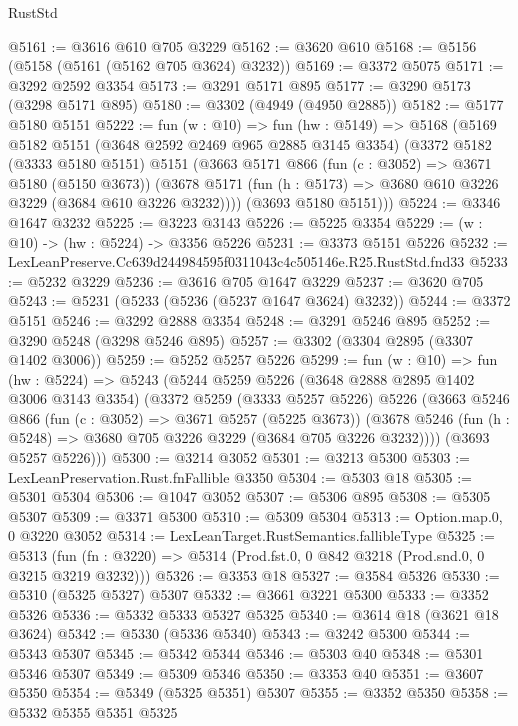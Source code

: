 \begin{lexlean}{RustStd}
\begin{coremodule}
@5161 := @3616 @610 @705 @3229
@5162 := @3620 @610
@5168 := @5156 (@5158 (@5161 (@5162 @705 @3624) @3232))
@5169 := @3372 @5075
@5171 := @3292 @2592 @3354
@5173 := @3291 @5171 @895
@5177 := @3290 @5173 (@3298 @5171 @895)
@5180 := @3302 (@4949 (@4950 @2885))
@5182 := @5177 @5180 @5151
@5222 := fun (w : @10) =>
  fun (hw : @5149) =>
  @5168
    (@5169
      @5182
      @5151
      (@3648 @2592 @2469 @965 @2885 @3145 @3354)
      (@3372
        @5182
        (@3333 @5180 @5151)
        @5151
        (@3663
          @5171
          @866
          (fun (c : @3052) => @3671 @5180 (@5150 @3673))
          (@3678 @5171 (fun (h : @5173) => @3680 @610 @3226 @3229 (@3684 @610 @3226 @3232))))
        (@3693 @5180 @5151)))
@5224 := @3346 @1647 @3232
@5225 := @3223 @3143
@5226 := @5225 @3354
@5229 := (w : @10) -> (hw : @5224) -> @3356 @5226
@5231 := @3373 @5151 @5226
@5232 := LexLeanPreserve.Cc639d244984595f0311043c4c505146e.R25.RustStd.fnd33
@5233 := @5232 @3229
@5236 := @3616 @705 @1647 @3229
@5237 := @3620 @705
@5243 := @5231 (@5233 (@5236 (@5237 @1647 @3624) @3232))
@5244 := @3372 @5151
@5246 := @3292 @2888 @3354
@5248 := @3291 @5246 @895
@5252 := @3290 @5248 (@3298 @5246 @895)
@5257 := @3302 (@3304 @2895 (@3307 @1402 @3006))
@5259 := @5252 @5257 @5226
@5299 := fun (w : @10) =>
  fun (hw : @5224) =>
  @5243
    (@5244
      @5259
      @5226
      (@3648 @2888 @2895 @1402 @3006 @3143 @3354)
      (@3372
        @5259
        (@3333 @5257 @5226)
        @5226
        (@3663
          @5246
          @866
          (fun (c : @3052) => @3671 @5257 (@5225 @3673))
          (@3678 @5246 (fun (h : @5248) => @3680 @705 @3226 @3229 (@3684 @705 @3226 @3232))))
        (@3693 @5257 @5226)))
@5300 := @3214 @3052
@5301 := @3213 @5300
@5303 := LexLeanPreservation.Rust.fnFallible @3350
@5304 := @5303 @18
@5305 := @5301 @5304
@5306 := @1047 @3052
@5307 := @5306 @895
@5308 := @5305 @5307
@5309 := @3371 @5300
@5310 := @5309 @5304
@5313 := Option.map.{0, 0} @3220 @3052
@5314 := LexLeanTarget.RustSemantics.fallibleType
@5325 := @5313
    (fun (fn : @3220) => @5314 (Prod.fst.{0, 0} @842 @3218 (Prod.snd.{0, 0} @3215 @3219 @3232)))
@5326 := @3353 @18
@5327 := @3584 @5326
@5330 := @5310 (@5325 @5327) @5307
@5332 := @3661 @3221 @5300
@5333 := @3352 @5326
@5336 := @5332 @5333 @5327 @5325
@5340 := @3614 @18 (@3621 @18 @3624)
@5342 := @5330 (@5336 @5340)
@5343 := @3242 @5300
@5344 := @5343 @5307
@5345 := @5342 @5344
@5346 := @5303 @40
@5348 := @5301 @5346 @5307
@5349 := @5309 @5346
@5350 := @3353 @40
@5351 := @3607 @5350
@5354 := @5349 (@5325 @5351) @5307
@5355 := @3352 @5350
@5358 := @5332 @5355 @5351 @5325

\end{coremodule}
\end{lexlean}
